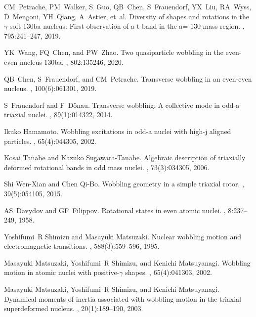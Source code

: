 \documentclass[11pt]{article}
\begin{document}
\begin{thebibliography}{99}
CM~Petrache, PM~Walker, S~Guo, QB~Chen, S~Frauendorf, YX~Liu, RA~Wyss,
  D~Mengoni, YH~Qiang, A~Astier, et~al.
\newblock Diversity of shapes and rotations in the $\gamma$-soft 130ba nucleus:
  First observation of a t-band in the a= 130 mass region.
, 795:241--247, 2019.

YK~Wang, FQ~Chen, and PW~Zhao.
\newblock Two quasiparticle wobbling in the even-even nucleus 130ba.
, 802:135246, 2020.

QB~Chen, S~Frauendorf, and CM~Petrache.
\newblock Transverse wobbling in an even-even nucleus.
, 100(6):061301, 2019.

S~Frauendorf and F~D{\"o}nau.
\newblock Transverse wobbling: A collective mode in odd-a triaxial nuclei.
, 89(1):014322, 2014.

Ikuko Hamamoto.
\newblock Wobbling excitations in odd-a nuclei with high-j aligned particles.
, 65(4):044305, 2002.

Kosai Tanabe and Kazuko Sugawara-Tanabe.
\newblock Algebraic description of triaxially deformed rotational bands in odd
  mass nuclei.
, 73(3):034305, 2006.

Shi Wen-Xian and Chen Qi-Bo.
\newblock Wobbling geometry in a simple triaxial rotor.
, 39(5):054105, 2015.

AS~Davydov and GF~Filippov.
\newblock Rotational states in even atomic nuclei.
, 8:237--249, 1958.

Yoshifumi~R Shimizu and Masayuki Matsuzaki.
\newblock Nuclear wobbling motion and electromagnetic transitions.
, 588(3):559--596, 1995.

Masayuki Matsuzaki, Yoshifumi~R Shimizu, and Kenichi Matsuyanagi.
\newblock Wobbling motion in atomic nuclei with positive-$\gamma$ shapes.
, 65(4):041303, 2002.

Masayuki Matsuzaki, Yoshifumi~R Shimizu, and Kenichi Matsuyanagi.
\newblock Dynamical moments of inertia associated with wobbling motion in the
  triaxial superdeformed nucleus.
,
  20(1):189--190, 2003.


\end{thebibliography}
\end{document}
